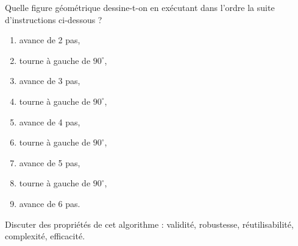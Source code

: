 \begin{question}
Quelle figure géométrique dessine-t-on en exécutant dans l'ordre la suite d'instructions 
ci-dessous ?
\begin{enumerate}
	\item avance de 2 pas,
	\item tourne à gauche de $90^\circ$,
	\item avance de 3 pas,
	\item tourne à gauche de $90^\circ$,
	\item avance de 4 pas,
	\item tourne à gauche de $90^\circ$,
	\item avance de 5 pas,
	\item tourne à gauche de $90^\circ$,
	\item avance de 6 pas.
\end{enumerate}
Discuter des propriétés de cet algorithme : validité, robustesse, réutilisabilité, complexité, efficacité.
\end{question}

